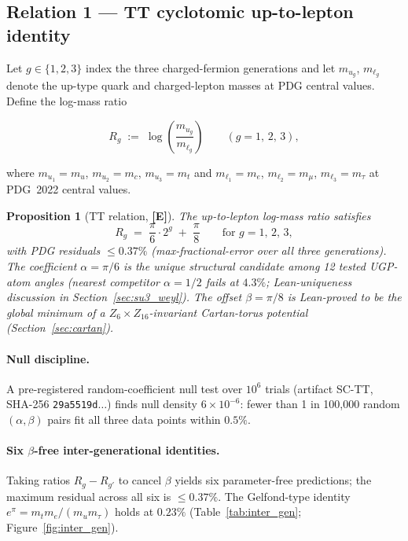\documentclass[11pt]{article}
\newtheorem{proposition}[theorem]{Proposition}
\theoremstyle{remark}
\newcommand{\paren}[1]{\left(#1\right)}
\begin{document}
\subsection{Relation 1 --- TT cyclotomic up-to-lepton identity}
\label{sec:tt}

Let $g\in\{1,2,3\}$ index the three charged-fermion generations and let $m_{u_g}$,
$m_{\ell_g}$ denote the up-type quark and charged-lepton masses at PDG central values.
Define the log-mass ratio

\begin{equation}
  R_g \;:=\; \log\!\paren{\frac{m_{u_g}}{m_{\ell_g}}}
  \qquad (g=1,\,2,\,3),
  \label{eq:TT_ratio}
\end{equation}

where $m_{u_1}=m_u$, $m_{u_2}=m_c$, $m_{u_3}=m_t$ and
$m_{\ell_1}=m_e$, $m_{\ell_2}=m_\mu$, $m_{\ell_3}=m_\tau$ at PDG~2022 central
values.

\begin{tcolorbox}[claimC]
\begin{proposition}[TT relation, \textbf{[E]}]
\label{prop:TT}
The up-to-lepton log-mass ratio satisfies
\begin{equation}
  R_g \;=\; \frac{\pi}{6}\cdot 2^g \;+\; \frac{\pi}{8}
  \qquad \text{for } g = 1,\, 2,\, 3,
  \label{eq:TT}
\end{equation}
with PDG residuals $\leq 0.37\%$ (max-fractional-error over all three generations).
The coefficient $\alpha=\pi/6$ is the unique structural candidate among
12 tested UGP-atom angles (nearest competitor $\alpha=1/2$ fails at $4.3\%$;
Lean-uniqueness discussion in Section~\ref{sec:su3_weyl}).
The offset $\beta=\pi/8$ is Lean-proved to be the global minimum of a
$Z_6\times Z_{16}$-invariant Cartan-torus potential (Section~\ref{sec:cartan}).
\end{proposition}
\end{tcolorbox}

\paragraph{Null discipline.}
A pre-registered random-coefficient null test over $10^6$ trials (artifact
SC-TT, SHA-256 \texttt{29a5519d}$\ldots$) finds null density $6\times10^{-6}$:
fewer than 1 in 100{,}000 random $(\alpha,\beta)$ pairs fit all three data
points within $0.5\%$.

\paragraph{Six $\beta$-free inter-generational identities.}
Taking ratios $R_g - R_{g'}$ to cancel $\beta$ yields six parameter-free
predictions; the maximum residual across all six is $\leq 0.37\%$.
The Gelfond-type identity $e^\pi = m_t m_e / (m_u m_\tau)$ holds at $0.23\%$
(Table~\ref{tab:inter_gen}; Figure~\ref{fig:inter_gen}).
\end{document}
